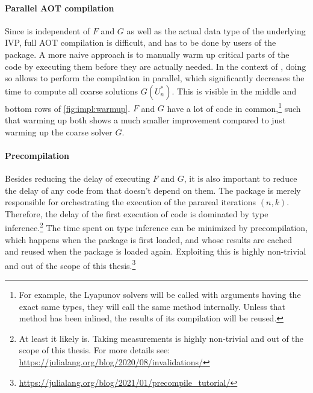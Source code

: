 \paragraph{Parallel \acs{AOT} compilation}

Since  is independent of $F$ and $G$ as well as the actual data type of the underlying \ac{IVP},
full \ac{AOT} compilation is difficult, and has to be done by users of the package.
A more naive approach is to manually warm up critical parts of the code by executing them before they are actually needed.
In the context of ,
doing so allows to perform the compilation in parallel,
which significantly decreases the time to compute all coarse solutions $G(U_n^*)$.
This is visible in the middle and bottom rows of \autoref{fig:impl:warmup}.
$F$ and $G$ have a lot of code in common,\footnote{%
  For example, the Lyapunov solvers will be called with arguments having the exact same types,
  \ie they will call the same method internally.
  Unless that method has been inlined, the results of its compilation will be reused.
}
such that warming up both shows a much smaller improvement compared to just warming up the coarse solver $G$.

\paragraph{Precompilation}

Besides reducing the delay of executing $F$ and $G$,
it is also important to reduce the delay of any code from  that doesn't depend on them.
The package is merely responsible for orchestrating the execution of the parareal iterations $(n,k)$.
Therefore, the delay of the first execution of  code is dominated by type inference.\footnote{%
  At least it likely is. Taking measurements is highly non-trivial and out of the scope of this thesis.
  For more details see: \url{https://julialang.org/blog/2020/08/invalidations/}
}
The time spent on type inference can be minimized by precompilation,
which happens when the package is first loaded,
and whose results are cached and reused when the package is loaded again.
Exploiting this is highly non-trivial and out of the scope of this thesis.\footnote{\url{https://julialang.org/blog/2021/01/precompile_tutorial/}}


